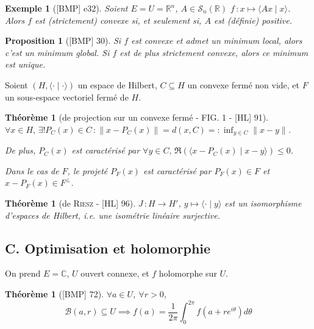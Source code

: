 \documentclass[10pt, a4paper, parskip=full, twoside, twocolumn]{report}
\newtheorem{theorem}[definition]{Théorème}
\newtheorem{proposition}[definition]{Proposition}
\newtheorem{example}[definition]{Exemple}
\newcommand{\IC}{\mathbb{C}}
\newcommand{\IR}{\mathbb{R}}
\newcommand{\B}{\mathcal{B}}
\newcommand{\ps}[2]{\langle #1\mid #2\rangle}
\begin{document}
\begin{example}[\textnormal{[BMP] e32}]
	Soient $E = U = \IR^n$, $A\in\mathcal{S}_n(\IR)$ $f\,\colon x\mapsto \ps{Ax}{x}$.
	Alors $f$ est (strictement) convexe si, et seulement si, $A$ est (définie) positive.
\end{example}

\begin{proposition}[\textnormal{[BMP] 30}]
	Si $f$ est convexe et admet un minimum local, alors c'est un minimum global. Si $f$ est de plus strictement convexe, alors ce minimum est unique.
\end{proposition}

\textcolor{paragraphtext}{Soient $(H,\ps{\cdot}{\cdot})$ un espace de Hilbert, $C\subseteq H$ un convexe fermé non vide, et $F$ un sous-espace vectoriel fermé de $H$.}

\begin{tcolorbox}[
    breakable, %
    colback=developpement, %
    colframe=gray!0!black, %
    boxrule=0pt, %
    arc=1mm, %
	boxsep=0pt,
	left=0pt, right=0pt, top=0pt, bottom=0pt
]
\begin{theorem}[de projection sur un convexe fermé - FIG. 1 - \textnormal{[HL] 91}]
	\label{219dev11}
	$\forall x\in H,\, \exists ! P_C(x)\in C\,\colon \|x-P_C(x)\| = d(x,C) =: \inf_{y\in C} \|x-y\|$.

	De plus, $P_C(x)$ est caractérisé par $\forall y\in C,\, \Re(\ps{x-P_C(x)}{x-y})\leq 0$.

	Dans le cas de $F$, le projeté $P_F(x)$ est caractérisé par $P_F(x)\in F$ et $x-P_F(x)\in F^{\perp}$.
\end{theorem}

\begin{theorem}[de \textsc{Riesz} - \textnormal{[HL] 96}]
	\label{219dev12}
	$J\,\colon H\to H'$, $y\mapsto\ps{\cdot}{y}$ est un isomorphisme d'espaces de Hilbert, \emph{i.e.} une isométrie linéaire surjective.
\end{theorem}
\end{tcolorbox}

\subsection*{C. Optimisation et holomorphie}
\textcolor{paragraphtext}{On prend $E =\IC$, $U$ ouvert connexe, et $f$ holomorphe sur $U$.}

\begin{theorem}[\textnormal{[BMP] 72}]
	$\forall a\in U$, $\forall r > 0$, 
	$$\B(a,r)\subseteq U \implies f(a) = \frac{1}{2\pi}\int_{0}^{2\pi} f(a + re^{i\theta})d\theta$$
\end{theorem}
\end{document}
